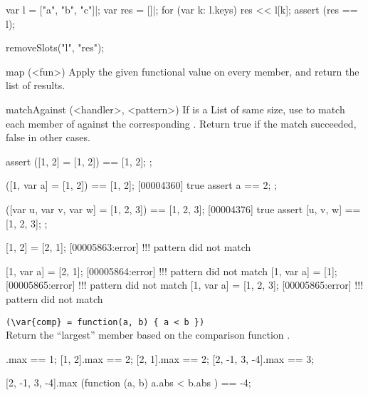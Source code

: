 \begin{urbiscriptapi}
\begin{urbiscript}
var l = ["a", "b", "c"]|;
var res = []|;
for (var k: l.keys)
  res << l[k];
assert (res == l);
\end{urbiscript}
\begin{urbicomment}
removeSlots("l", "res");
\end{urbicomment}


\item[map](<fun>)%
  Apply the given functional value on every member, and return the list of
  results.



\item[matchAgainst](<handler>, <pattern>)%
  If  is a List of same size, use  to match each
  member of \this against the corresponding .  Return true if
  the match succeeded, false in other cases.
\begin{urbiscript}
assert
{
  ([1, 2] = [1, 2]) == [1, 2];
};

([1, var a] = [1, 2]) == [1, 2];
[00004360] true
assert
{
  a == 2;
};

([var u, var v, var w] = [1, 2, 3]) == [1, 2, 3];
[00004376] true
assert
{
  [u, v, w] == [1, 2, 3];
};

[1, 2] = [2, 1];
[00005863:error] !!! pattern did not match

[1, var a] = [2, 1];
[00005864:error] !!! pattern did not match
[1, var a] = [1];
[00005865:error] !!! pattern did not match
[1, var a] = [1, 2, 3];
[00005865:error] !!! pattern did not match
\end{urbiscript}


\item {}\lstinline|(\var{comp} = function(a, b) { a < b })|\\%
  Return the ``largest'' member based on the comparison function .
\begin{urbiassert}
           [1].max == 1;
        [1, 2].max == 2;
        [2, 1].max == 2;
[2, -1, 3, -4].max == 3;

[2, -1, 3, -4].max (function (a, b) { a.abs < b.abs }) == -4;
\end{urbiassert}


\end{urbiscriptapi}
